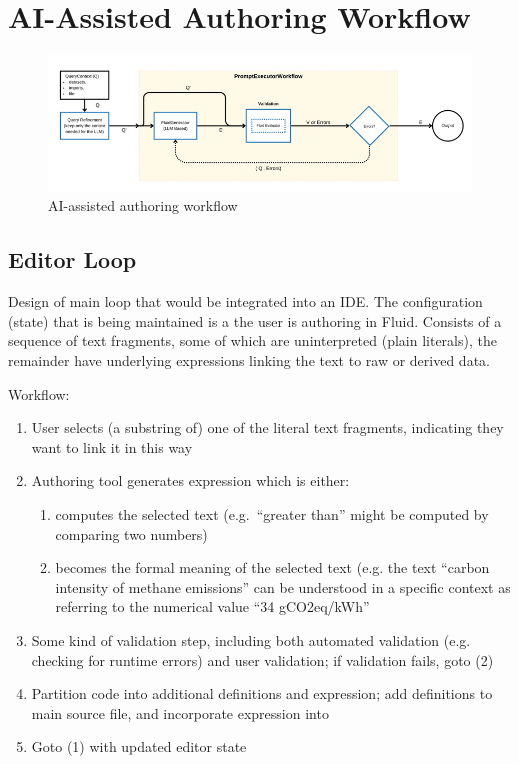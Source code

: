 \section{AI-Assisted Authoring Workflow}
\label{sec:authoring-workflow}

\begin{figure}
    \centering
    \includegraphics[width=0.95\linewidth]{fig/authoring-assistant-architecture.png}
    \caption{AI-assisted authoring workflow}
\end{figure}

\subsection{Editor Loop}
Design of main loop that would be integrated into an IDE. The configuration (state) that is being maintained
is a  the user is authoring in Fluid. Consists of a sequence of text fragments, some of which
are uninterpreted (plain literals), the remainder have underlying expressions linking the text to raw or derived
data.

Workflow:
\begin{enumerate}
\item User selects (a substring of) one of the literal text fragments, indicating they want to link it in this
way
\item Authoring tool generates expression which is either:
  \begin{enumerate}
  \item computes the selected text (e.g.~``greater than'' might be computed by comparing two numbers)
  \item becomes the formal meaning of the selected text (e.g. the text ``carbon intensity of methane
emissions'' can be understood in a specific context as referring to the numerical value ``34 gCO2eq/kWh''
  \end{enumerate}
\item Some kind of validation step, including both automated validation (e.g. checking for runtime errors) and
user validation; if validation fails, goto (2)
\item Partition code into additional definitions and expression; add definitions to main source file, and
incorporate expression into 
\item Goto (1) with updated editor state
\end{enumerate}

